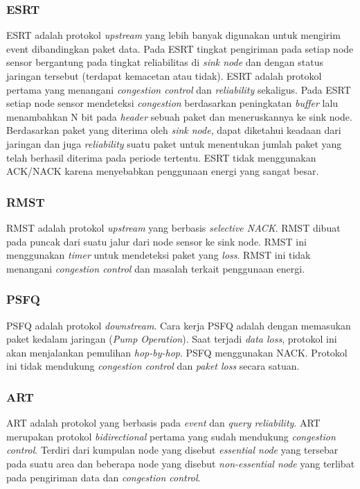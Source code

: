 \subsubsection{ESRT}
ESRT adalah protokol \textit{upstream} yang lebih banyak digunakan untuk mengirim event dibandingkan paket data. Pada ESRT tingkat pengiriman pada setiap node sensor bergantung pada tingkat reliabilitas di \textit{sink node} dan dengan status jaringan tersebut (terdapat kemacetan atau tidak). ESRT adalah protokol pertama yang menangani \textit{congestion control} dan \textit{reliability} sekaligus. Pada ESRT setiap node sensor mendeteksi \textit{congestion} berdasarkan peningkatan \textit{buffer} lalu menambahkan N bit pada \textit{header} sebuah paket dan meneruskannya ke sink node. Berdasarkan paket yang diterima oleh \textit{sink node}, dapat diketahui keadaan dari jaringan dan juga \textit{reliability} suatu paket untuk menentukan jumlah paket yang telah berhasil diterima pada periode tertentu. ESRT tidak menggunakan ACK/NACK karena menyebabkan penggunaan energi yang sangat besar.

\subsubsection{RMST}
RMST adalah protokol \textit{upstream} yang berbasis \textit{selective NACK}. RMST dibuat pada puncak dari suatu jalur dari node sensor ke sink node. RMST ini menggunakan \textit{timer} untuk mendeteksi paket yang \textit{loss}. RMST ini tidak menangani \textit{congestion control} dan masalah terkait penggunaan energi.

\subsubsection{PSFQ}
PSFQ adalah protokol \textit{downstream}. Cara kerja PSFQ adalah dengan memasukan paket kedalam jaringan (\textit{Pump Operation}). Saat terjadi \textit{data loss}, protokol ini akan menjalankan pemulihan \textit{hop-by-hop}. PSFQ menggunakan NACK. Protokol ini tidak mendukung \textit{congestion control} dan \textit{paket loss} secara satuan.

\subsubsection{ART}
ART adalah protokol yang berbasis pada \textit{event} dan \textit{query reliability}. ART merupakan protokol \textit{bidirectional} pertama yang sudah mendukung \textit{congestion control}. Terdiri dari kumpulan node yang disebut \textit{essential node} yang tersebar pada suatu area dan beberapa node yang disebut \textit{non-essential node} yang terlibat pada pengiriman data dan \textit{congestion control}.

